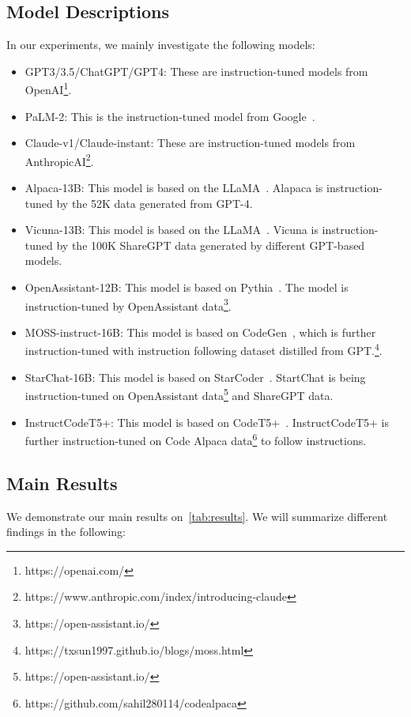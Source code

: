 \documentclass[11pt]{article}
\begin{document}
\subsection{Model Descriptions}
In our experiments, we mainly investigate the following models:
\begin{itemize}
    \item GPT3/3.5/ChatGPT/GPT4: These are instruction-tuned models from OpenAI\footnote{https://openai.com/}. 
    \item PaLM-2: This is the instruction-tuned model from Google~\cite{palm2}.
    \item Claude-v1/Claude-instant: These are instruction-tuned models from AnthropicAI\footnote{https://www.anthropic.com/index/introducing-claude}.
    \item Alpaca-13B: This model is based on the LLaMA~\cite{touvron2023llama}. Alapaca is instruction-tuned by the 52K data generated from GPT-4.
    \item Vicuna-13B: This model is based on the LLaMA~\cite{touvron2023llama}. Vicuna is instruction-tuned by the 100K ShareGPT data generated by different GPT-based models.
    \item OpenAssistant-12B: This model is based on Pythia~\cite{biderman2023pythia}. The model is instruction-tuned by OpenAssistant data\footnote{https://open-assistant.io/}.
    \item MOSS-instruct-16B: This model is based on CodeGen~\cite{nijkamp2022codegen}, which is further instruction-tuned with instruction following dataset distilled from GPT.\footnote{https://txsun1997.github.io/blogs/moss.html}. 
    \item StarChat-16B: This model is based on StarCoder~\cite{li2023starcoder}. StartChat is being instruction-tuned on OpenAssistant data\footnote{https://open-assistant.io/} and ShareGPT data.
    \item InstructCodeT5+: This model is based on CodeT5+~\cite{wang2023codet5+}. InstructCodeT5+ is further instruction-tuned on Code Alpaca data\footnote{https://github.com/sahil280114/codealpaca} to follow instructions.
\end{itemize}

\subsection{Main Results}
We demonstrate our main results on~\autoref{tab:results}. We will summarize different findings in the following:
\end{document}
